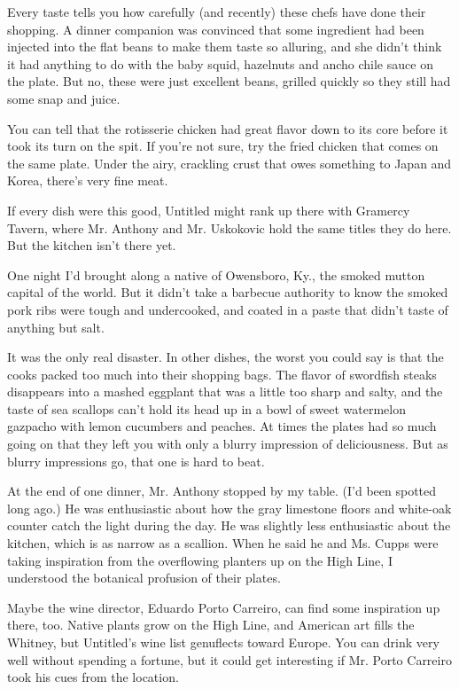 Every taste tells you how carefully (and recently) these chefs have done
their shopping. A dinner companion was convinced that some ingredient
had been injected into the flat beans to make them taste so alluring,
and she didn't think it had anything to do with the baby squid,
hazelnuts and ancho chile sauce on the plate. But no, these were just
excellent beans, grilled quickly so they still had some snap and juice.

You can tell that the rotisserie chicken had great flavor down to its
core before it took its turn on the spit. If you're not sure, try the
fried chicken that comes on the same plate. Under the airy, crackling
crust that owes something to Japan and Korea, there's very fine meat.

If every dish were this good, Untitled might rank up there with Gramercy
Tavern, where Mr. Anthony and Mr. Uskokovic hold the same titles they do
here. But the kitchen isn't there yet.

One night I'd brought along a native of Owensboro, Ky., the smoked
mutton capital of the world. But it didn't take a barbecue authority to
know the smoked pork ribs were tough and undercooked, and coated in a
paste that didn't taste of anything but salt.

It was the only real disaster. In other dishes, the worst you could say
is that the cooks packed too much into their shopping bags. The flavor
of swordfish steaks disappears into a mashed eggplant that was a little
too sharp and salty, and the taste of sea scallops can't hold its head
up in a bowl of sweet watermelon gazpacho with lemon cucumbers and
peaches. At times the plates had so much going on that they left you
with only a blurry impression of deliciousness. But as blurry
impressions go, that one is hard to beat.

At the end of one dinner, Mr. Anthony stopped by my table. (I'd been
spotted long ago.) He was enthusiastic about how the gray limestone
floors and white-oak counter catch the light during the day. He was
slightly less enthusiastic about the kitchen, which is as narrow as a
scallion. When he said he and Ms. Cupps were taking inspiration from the
overflowing planters up on the High Line, I understood the botanical
profusion of their plates.

Maybe the wine director, Eduardo Porto Carreiro, can find some
inspiration up there, too. Native plants grow on the High Line, and
American art fills the Whitney, but Untitled's wine list genuflects
toward Europe. You can drink very well without spending a fortune, but
it could get interesting if Mr. Porto Carreiro took his cues from the
location.

